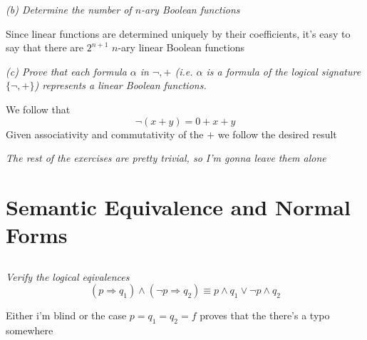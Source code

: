 \documentclass[11pt,oneside,titlepage]{book}
\DeclareMathOperator \ra {\Rightarrow}
\newcommand{\set}[1]{\{ #1 \}}
\begin{document}
\textit{(b) Determine the number of $n$-ary Boolean functions}

Since linear functions are determined uniquely by their coefficients, it's easy to say
that there are $2^{n + 1}$ $n$-ary linear Boolean functions

\textit{(c) Prove that each formula $\alpha$ in $\neg, +$ (i.e. $\alpha$ is a formula of the
  logical signature $\set{\neg, +}$) represents a linear Boolean functions.}

We follow that
$$\neg(x + y) = 0 + x + y$$
Given associativity and commutativity of the $+$ we follow the desired result

\textit{The rest of the exercises are pretty trivial, so I'm gonna leave them alone}

\section{Semantic Equivalence and Normal Forms}

\subsection{}

\textit{Verify the logical eqivalences}
$$(p \ra q_1) \land (\neg p \ra q_2) \equiv p \land q_1 \lor \neg p \land q_2$$

Either i'm blind or the case $p = q_1 = q_2 = f$ proves that the there's a typo somewhere
\end{document}
